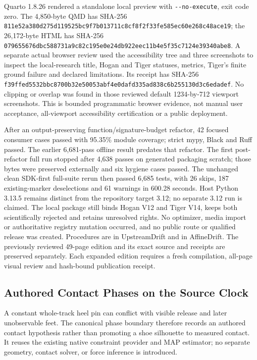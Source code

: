 \documentclass[11pt,letterpaper]{article}
\newcommand{\code}[1]{\nolinkurl{#1}}
\newcommand{\hash}[1]{{\footnotesize\nolinkurl{#1}}}
\begin{document}
Quarto 1.8.26 rendered a standalone local preview with \code{--no-execute},
exit code zero. The 4,850-byte QMD has SHA-256
\hash{811e52a380d275d119525bc9f7b013711c8cf8f2f33fe585ec60e268c48ace19};
the 26,172-byte HTML has SHA-256
\hash{079655676dbc588731a9c82c195e0e24db922eec11b4e5f35c7124e39340abe8}.
A separate actual browser review used the accessibility tree and three
screenshots to inspect the local-research title, Hogan and Tiger statuses,
metrics, Tiger's finite ground failure and declared limitations. Its receipt
has SHA-256
\hash{f39ffed5532bbc8700b32e50053abf4e0dafd335ad838c6b255130d3c6edadef}.
No clipping or overlap was found in those reviewed default 1234-by-712 viewport
screenshots. This is bounded programmatic browser evidence, not manual user
acceptance, all-viewport accessibility certification or a public deployment.

After an output-preserving function/signature-budget refactor, 42 focused
consumer cases passed with 95.35\% module coverage; strict mypy, Black and Ruff
passed. The earlier 6,681-pass offline result predates that refactor. The first
post-refactor full run stopped after 4,638 passes on generated packaging scratch;
those bytes were preserved externally and six hygiene cases passed. The unchanged
clean SDK-first full-suite rerun then passed 6,685 tests, with 26 skips, 187
existing-marker deselections and 61 warnings in 600.28 seconds. Host Python
3.13.5 remains distinct from the repository target 3.12; no separate 3.12 run
is claimed. The local package still binds Hogan V12 and
Tiger V14, keeps both scientifically rejected and retains unresolved rights.
No optimizer, media import or authoritative registry mutation occurred, and
no public route or qualified release was created. Procedures are
 in UpstreamDrift and
 in AffineDrift. The
previously reviewed 49-page edition and its exact source and receipts are
preserved separately. Each expanded edition requires a fresh compilation,
all-page visual review and hash-bound publication receipt.

\subsection{Authored Contact Phases on the Source Clock}
\label{sec:contact-phases}
A constant whole-track heel pin can conflict with visible release and later
unobservable feet. The canonical phase boundary therefore records an authored
contact hypothesis rather than promoting a shoe silhouette to measured
contact. It reuses the existing native constraint provider and MAP estimator;
no separate geometry, contact solver, or force inference is introduced.
\end{document}
